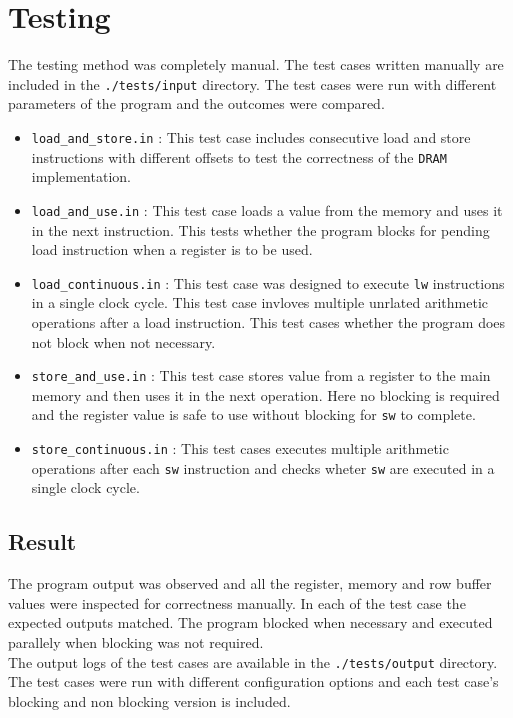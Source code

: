 \documentclass[hidelinks,12pt]{article}
\begin{document}
\section{Testing}

The testing method was completely manual. The test cases written manually are included in the \verb|./tests/input| directory. The test cases were run with different parameters
of the program and the outcomes were compared.
\begin{itemize}
    \item \verb|load_and_store.in| : This test case includes consecutive load and store instructions with different offsets to test the correctness of the \verb|DRAM| implementation.
    \item \verb|load_and_use.in| : This test case loads a value from the memory and uses it in the next instruction. This tests whether the program blocks for pending load instruction when a register is to be used.
    \item \verb|load_continuous.in| : This test case was designed to execute \verb|lw| instructions in a single clock cycle. This test case invloves multiple unrlated arithmetic operations after a load instruction. This test cases whether the program does not block when not necessary.
    \item \verb|store_and_use.in| : This test case stores value from a register to the main memory and then uses it in the next operation. Here no blocking is required and the register value is safe to use without blocking for \verb|sw| to complete.
    \item \verb|store_continuous.in| : This test cases executes multiple arithmetic operations after each \verb|sw| instruction and checks wheter \verb|sw| are executed in a single clock cycle.
\end{itemize}

\subsection{Result}
The program output was observed and all the register, memory and row buffer values were inspected for correctness manually. In each of the test case the expected outputs matched. The program blocked when necessary and executed parallely when blocking was not required.\\[0.2cm]
The output logs of the test cases are available in the \verb|./tests/output| directory. The test cases were run with different configuration options and each test case's blocking and non blocking version is included.
\end{document}
